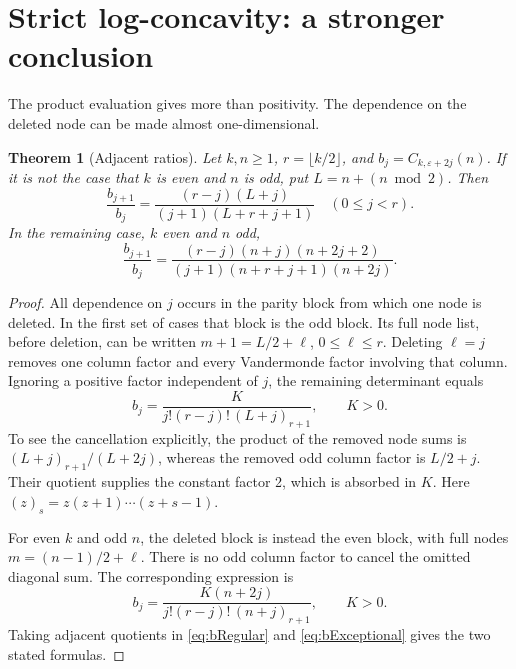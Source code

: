 \documentclass[11pt,letterpaper]{article}
\numberwithin{equation}{section}
\newtheorem{theorem}{Theorem}[section]
\theoremstyle{definition}
\newcommand{\eps}{\varepsilon}
\newcommand{\rising}[2]{(#1)_{#2}}
\begin{document}
\section{Strict log-concavity: a stronger conclusion}\label{sec:logconcavity}
The product evaluation gives more than positivity. The dependence on the
deleted node can be made almost one-dimensional.

\begin{theorem}[Adjacent ratios]\label{thm:ratios}
Let \(k,n\ge1\), \(r=\lfloor k/2\rfloor\), and
\(b_j=C_{k,\eps+2j}(n)\). If it is not the case that \(k\) is even
and \(n\) is odd, put \(L=n+(n\bmod2)\). Then
\begin{equation}\label{eq:ratioRegular}
 \frac{b_{j+1}}{b_j}
 =\frac{(r-j)(L+j)}{(j+1)(L+r+j+1)}\quad(0\le j<r).
\end{equation}
In the remaining case, \(k\) even and \(n\) odd,
\begin{equation}\label{eq:ratioExceptional}
 \frac{b_{j+1}}{b_j}
 =\frac{(r-j)(n+j)(n+2j+2)}
 {(j+1)(n+r+j+1)(n+2j)}.
\end{equation}
\end{theorem}
\begin{proof}
All dependence on \(j\) occurs in the parity block from which one
node is deleted. In the first set of cases that block is the odd block.
Its full node list, before deletion, can be written
\(m+1=L/2+\ell\), \(0\le\ell\le r\).
Deleting \(\ell=j\) removes one column factor and every
Vandermonde factor involving that column. Ignoring a positive factor
independent of \(j\), the remaining determinant equals
\begin{equation}\label{eq:bRegular}
 b_j=\frac{K}{j!(r-j)!\,\rising{L+j}{r+1}},
 \qquad K>0.
\end{equation}
To see the cancellation explicitly, the product of the removed node
sums is
\(\rising{L+j}{r+1}/(L+2j)\), whereas the removed odd column factor
is \(L/2+j\). Their quotient supplies the constant factor 2, which
is absorbed in \(K\). Here \((z)_s=z(z+1)\cdots(z+s-1)\).

For even \(k\) and odd \(n\), the deleted block is instead the even
block, with full nodes \(m=(n-1)/2+\ell\). There is no odd column
factor to cancel the omitted diagonal sum. The corresponding expression is
\begin{equation}\label{eq:bExceptional}
 b_j=\frac{K(n+2j)}{j!(r-j)!\,\rising{n+j}{r+1}},
 \qquad K>0.
\end{equation}
Taking adjacent quotients in \eqref{eq:bRegular} and
\eqref{eq:bExceptional} gives the two stated formulas.
\end{proof}
\end{document}
